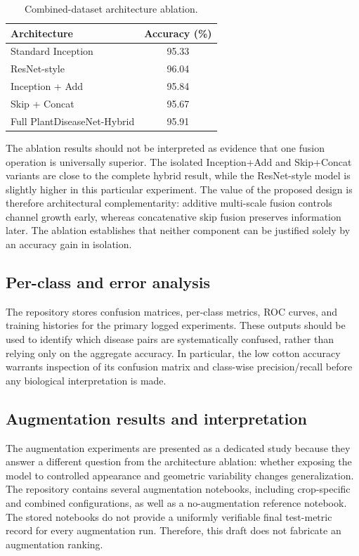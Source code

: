\documentclass[a4paper,fleqn]{cas-dc}
\begin{document}
\begin{table}[t]
\centering
\caption{Combined-dataset architecture ablation.}
\label{tab:ablation}
\begin{tabular}{p{3.4cm}c}
\toprule
Architecture & Accuracy (\%)\\
\midrule
Standard Inception & 95.33\\
ResNet-style & 96.04\\
Inception + Add & 95.84\\
Skip + Concat & 95.67\\
Full PlantDiseaseNet-Hybrid & 95.91\\
\bottomrule
\end{tabular}
\end{table}

The ablation results should not be interpreted as evidence that one fusion operation is universally superior. The isolated Inception+Add and Skip+Concat variants are close to the complete hybrid result, while the ResNet-style model is slightly higher in this particular experiment. The value of the proposed design is therefore architectural complementarity: additive multi-scale fusion controls channel growth early, whereas concatenative skip fusion preserves information later. The ablation establishes that neither component can be justified solely by an accuracy gain in isolation.

\subsection{Per-class and error analysis}
The repository stores confusion matrices, per-class metrics, ROC curves, and training histories for the primary logged experiments. These outputs should be used to identify which disease pairs are systematically confused, rather than relying only on the aggregate accuracy. In particular, the low cotton accuracy warrants inspection of its confusion matrix and class-wise precision/recall before any biological interpretation is made.

\subsection{Augmentation results and interpretation}
The augmentation experiments are presented as a dedicated study because they answer a different question from the architecture ablation: whether exposing the model to controlled appearance and geometric variability changes generalization. The repository contains several augmentation notebooks, including crop-specific and combined configurations, as well as a no-augmentation reference notebook. The stored notebooks do not provide a uniformly verifiable final test-metric record for every augmentation run. Therefore, this draft does not fabricate an augmentation ranking.
\end{document}
